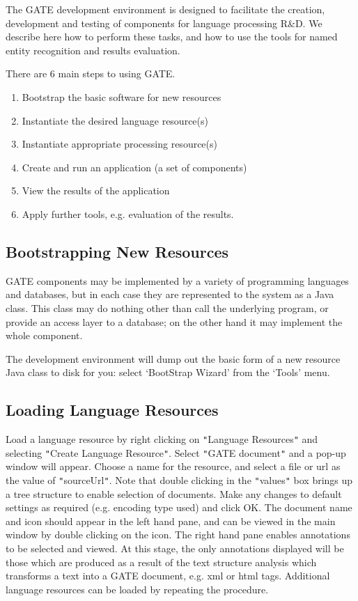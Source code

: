 \label{f0:the-development-environment}
The GATE development environment is designed to facilitate the creation,
development and testing of components for language processing R\&D.
We describe here how to perform these tasks, and
how to use the tools for named entity recognition and results evaluation.

There are 6 main steps to using GATE.
\begin{enumerate}
\item Bootstrap the basic software for new resources
\item Instantiate the desired language resource(s)
\item Instantiate appropriate processing resource(s)
\item Create and run an application (a set of components)
\item View the results of the application
\item Apply further tools, e.g. evaluation of the results.
\end{enumerate}

\subsection{Bootstrapping New Resources}

GATE components may be implemented by a variety of programming languages and
databases, but in each case they are represented to the system as a Java
class. This class may do nothing other than call the underlying program, or
provide an access layer to a database; on the other hand 
it may implement the whole component.

The development environment will dump out the basic form of a new resource
Java class to disk for you: select `BootStrap Wizard' from the `Tools' menu.

\subsection{Loading Language Resources}


Load a language resource by right clicking on {\tt{}"{}}Language Resources{\tt{}"{}} and
selecting {\tt{}"{}}Create Language Resource{\tt{}"{}}. Select {\tt{}"{}}GATE document{\tt{}"{}} and a
pop-up window will appear. Choose a name for the resource, and select
a file or url as the value of {\tt{}"{}}sourceUrl{\tt{}"{}}. Note that double clicking
in the {\tt{}"{}}values{\tt{}"{}} box brings up a tree structure to enable selection of
documents.
 Make any
changes to default settings as required (e.g. encoding type used) and
click OK. The document name and icon should appear in the left hand
pane, and can be viewed in the main window by double clicking on the
icon. The right hand pane enables annotations to be selected and
viewed. At this stage, the only annotations displayed will be those
which are produced as a result of the text structure analysis which
transforms a text into a GATE document, e.g. xml or html
tags. Additional language resources can be loaded by repeating the
procedure.

